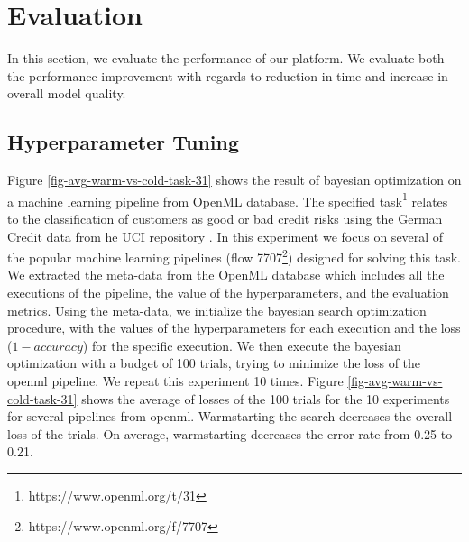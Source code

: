 \section{Evaluation} \label{sec-evaluation} 
In this section, we evaluate the performance of our platform.
We evaluate both the performance improvement with regards to reduction in time and increase in overall model quality.

\subsection{Hyperparameter Tuning}
Figure \ref{fig-avg-warm-vs-cold-task-31} shows the result of bayesian optimization on a machine learning pipeline from OpenML database.
The specified task\footnote{https://www.openml.org/t/31} relates to the classification of customers as good or bad credit risks using the German Credit data from he UCI repository \cite{Dua:2017}.
In this experiment we focus on several of the popular machine learning pipelines (flow 7707\footnote{https://www.openml.org/f/7707}) designed for solving this task.
We extracted the meta-data from the OpenML database which includes all the executions of the pipeline, the value of the hyperparameters, and the evaluation metrics.
Using the meta-data, we initialize the bayesian search optimization procedure, with the values of the hyperparameters for each execution and the loss ($1- accuracy$) for the specific execution.
We then execute the bayesian optimization with a budget of 100 trials, trying to minimize the loss of the openml pipeline.
We repeat this experiment 10 times.
Figure \ref{fig-avg-warm-vs-cold-task-31} shows the average of losses of the 100 trials for the 10 experiments for several pipelines from openml.
Warmstarting the search decreases the overall loss of the trials.
On average, warmstarting decreases the error rate from 0.25 to 0.21.
